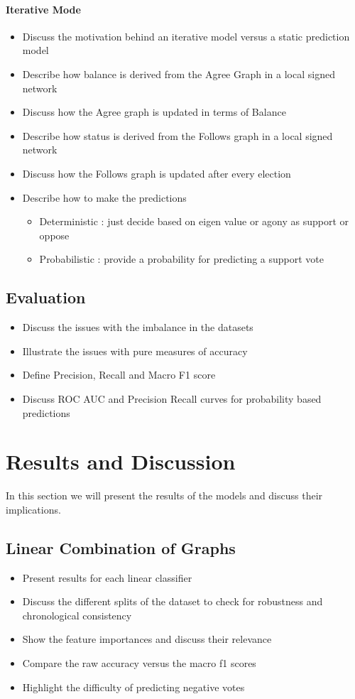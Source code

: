 \subsubsection{Iterative Mode}
\begin{itemize}
    \item Discuss the motivation behind an iterative model versus a static prediction model
    \item Describe how balance is derived from the Agree Graph in a local signed network
    \item Discuss how the Agree graph is updated in terms of Balance
    \item Describe how status is derived from the Follows graph in a local signed network 
    \item Discuss how the Follows graph is updated after every election
    \item Describe how to make the predictions 
    \begin{itemize}
        \item Deterministic : just decide based on eigen value or agony as support or oppose
        \item Probabilistic : provide a probability for predicting a support vote
    \end{itemize}
\end{itemize}
\section{Evaluation}
\begin{itemize}
    \item Discuss the issues with the imbalance in the datasets
    \item Illustrate the issues with pure measures of accuracy
    \item Define Precision, Recall and Macro F1 score
    \item Discuss ROC AUC and Precision Recall curves for probability based predictions 
\end{itemize}

\chapter{Results and Discussion} 
In this section we will present the results of the models and discuss their implications.
\section{Linear Combination of Graphs}
\begin{itemize}
    \item Present results for each linear classifier
    \item Discuss the different splits of the dataset to check for robustness and chronological consistency
    \item Show the feature importances and discuss their relevance 
    \item Compare the raw accuracy versus the macro f1 scores
    \item Highlight the difficulty of predicting negative votes
\end{itemize}
